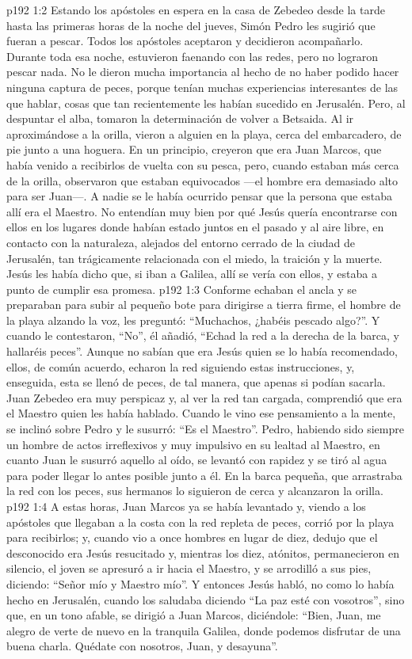 \vs p192 1:2 Estando los apóstoles en espera en la casa de Zebedeo desde la tarde hasta las primeras horas de la noche del jueves, Simón Pedro les sugirió que fueran a pescar. Todos los apóstoles aceptaron y decidieron acompañarlo. Durante toda esa noche, estuvieron faenando con las redes, pero no lograron pescar nada. No le dieron mucha importancia al hecho de no haber podido hacer ninguna captura de peces, porque tenían muchas experiencias interesantes de las que hablar, cosas que tan recientemente les habían sucedido en Jerusalén. Pero, al despuntar el alba, tomaron la determinación de volver a Betsaida. Al ir aproximándose a la orilla, vieron a alguien en la playa, cerca del embarcadero, de pie junto a una hoguera. En un principio, creyeron que era Juan Marcos, que había venido a recibirlos de vuelta con su pesca, pero, cuando estaban más cerca de la orilla, observaron que estaban equivocados ---el hombre era demasiado alto para ser Juan---. A nadie se le había ocurrido pensar que la persona que estaba allí era el Maestro. No entendían muy bien por qué Jesús quería encontrarse con ellos en los lugares donde habían estado juntos en el pasado y al aire libre, en contacto con la naturaleza, alejados del entorno cerrado de la ciudad de Jerusalén, tan trágicamente relacionada con el miedo, la traición y la muerte. Jesús les había dicho que, si iban a Galilea, allí se vería con ellos, y estaba a punto de cumplir esa promesa.
\vs p192 1:3 Conforme echaban el ancla y se preparaban para subir al pequeño bote para dirigirse a tierra firme, el hombre de la playa alzando la voz, les preguntó: “Muchachos, ¿habéis pescado algo?”. Y cuando le contestaron, “No”, él añadió, “Echad la red a la derecha de la barca, y hallaréis peces”. Aunque no sabían que era Jesús quien se lo había recomendado, ellos, de común acuerdo, echaron la red siguiendo estas instrucciones, y, enseguida, esta se llenó de peces, de tal manera, que apenas si podían sacarla. Juan Zebedeo era muy perspicaz y, al ver la red tan cargada, comprendió que era el Maestro quien les había hablado. Cuando le vino ese pensamiento a la mente, se inclinó sobre Pedro y le susurró: “Es el Maestro”. Pedro, habiendo sido siempre un hombre de actos irreflexivos y muy impulsivo en su lealtad al Maestro, en cuanto Juan le susurró aquello al oído, se levantó con rapidez y se tiró al agua para poder llegar lo antes posible junto a él. En la barca pequeña, que arrastraba la red con los peces, sus hermanos lo siguieron de cerca y alcanzaron la orilla.
\vs p192 1:4 A estas horas, Juan Marcos ya se había levantado y, viendo a los apóstoles que llegaban a la costa con la red repleta de peces, corrió por la playa para recibirlos; y, cuando vio a once hombres en lugar de diez, dedujo que el desconocido era Jesús resucitado y, mientras los diez, atónitos, permanecieron en silencio, el joven se apresuró a ir hacia el Maestro, y se arrodilló a sus pies, diciendo: “Señor mío y Maestro mío”. Y entonces Jesús habló, no como lo había hecho en Jerusalén, cuando los saludaba diciendo “La paz esté con vosotros”, sino que, en un tono afable, se dirigió a Juan Marcos, diciéndole: “Bien, Juan, me alegro de verte de nuevo en la tranquila Galilea, donde podemos disfrutar de una buena charla. Quédate con nosotros, Juan, y desayuna”.
